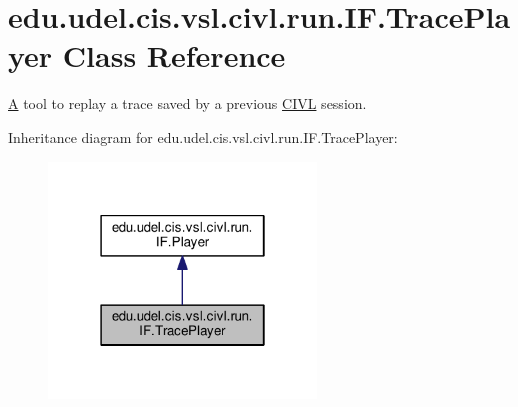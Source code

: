 \hypertarget{classedu_1_1udel_1_1cis_1_1vsl_1_1civl_1_1run_1_1IF_1_1TracePlayer}{}\section{edu.\+udel.\+cis.\+vsl.\+civl.\+run.\+I\+F.\+Trace\+Player Class Reference}
\label{classedu_1_1udel_1_1cis_1_1vsl_1_1civl_1_1run_1_1IF_1_1TracePlayer}


\hyperlink{structA}{A} tool to replay a trace saved by a previous \hyperlink{classedu_1_1udel_1_1cis_1_1vsl_1_1civl_1_1CIVL}{C\+I\+V\+L} session.  




Inheritance diagram for edu.\+udel.\+cis.\+vsl.\+civl.\+run.\+I\+F.\+Trace\+Player\+:
\nopagebreak
\begin{figure}[H]
\begin{center}
\leavevmode
\includegraphics[width=202pt]{classedu_1_1udel_1_1cis_1_1vsl_1_1civl_1_1run_1_1IF_1_1TracePlayer__inherit__graph}
\end{center}
\end{figure}


